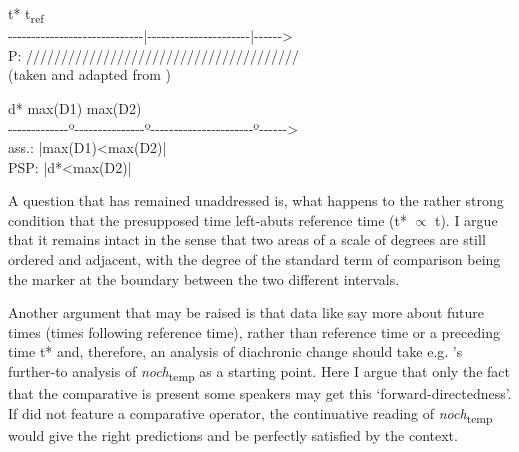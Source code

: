 \documentclass[output=paper,
modfonts
]{langscibook}
\begin{document}
\ea\label{diagram_temp_comp}
\ea \noindent\parbox[t]{\linewidth}{\hspace{43pt} t* \hspace{80pt} t\textsubscript{ref}\\
{-}{-}{-}{-}{-}{-}{-}{-}{-}{-}{-}{-}{-}{-}{-}{-}{-}{-}{-}{-}{-}{-}{-}{-}{-}{-}{-}{-}{-}{|}{-}{-}{-}{-}{-}{-}{-}{-}{-}{-}{-}{-}{-}{-}{-}{-}{-}{-}{-}{-}{-}{-}{|}{-}{-}{-}{-}{-}{-}>\\
P: \hspace{40pt}///////////////////////////////////////\\ (taken and adapted from \citealt{beck2016a_sub})}
\ex \noindent\parbox[t]{\linewidth}{\hspace{43pt} d* \hspace{30pt} max(D1) \hspace{42pt} max(D2)\\
{-}{-}{-}{-}{-}{-}{-}{-}{-}{-}{-}{-}{-}{º}{-}{-}{-}{-}{-}{-}{-}{-}{-}{-}{-}{-}{-}{-}{-}{º}{-}{-}{-}{-}{-}{-}{-}{-}{-}{-}{-}{-}{-}{-}{-}{-}{-}{-}{-}{-}{-}{-}{º}{-}{-}{-}{-}{-}{-}>\\
ass.: \hspace{85pt}|\hspace{1.125pt}max(D1)<max(D2)\hspace{1.125pt}|\\
PSP: \hspace{25pt}|\hspace{1pt}d*<max(D2)\hspace{1pt}|}
\z\z


A question that has remained unaddressed is, what happens to the rather strong condition that the presupposed time left-abuts reference time (t* $\propto$ t). I argue that it remains intact in the sense that two areas of a scale of degrees are still ordered and adjacent, with the degree of the standard term of comparison being the marker at the boundary between the two different intervals.

Another argument that may be raised is that data like  say more about future times (times following reference time), rather than reference time or a preceding time t* and, therefore, an analysis of diachronic change should take e.g. \citeauthor{beck2016a_sub}'s \citeyearpar{beck2016a_sub} further-to analysis of \textit{noch}\textsubscript{temp} as a starting point. Here I argue that only the fact that the comparative is present some speakers may get this `forward-directedness'. If  did not feature a comparative operator, the continuative reading of \textit{noch}\textsubscript{temp} would give the right predictions and be perfectly satisfied by the context. 
\end{document}
